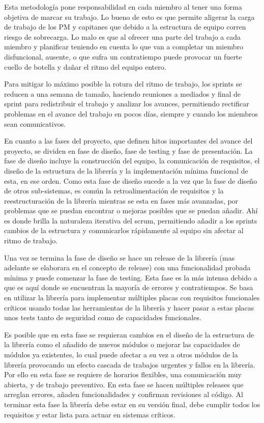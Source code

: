 \documentclass{report}
\begin{document}
Esta metodología pone responsabilidad en cada miembro al tener una forma objetiva de marcar su trabajo. Lo bueno de esto es que permite aligerar la carga de trabajo de los PM y capitanes que debido a la estructura de equipo corren riesgo de sobrecarga. Lo malo es que al ofrecer una parte del trabajo a cada miembro y planificar teniendo en cuenta lo que van a completar un miembro disfuncional, ausente, o que sufra un contratiempo puede provocar un fuerte cuello de botella y dañar el ritmo del equipo entero. \par
Para mitigar lo máximo posible la rotura del ritmo de trabajo, los sprints se reducen a una semana de tamaño, haciendo reuniones a mediados y final de sprint para redistribuir el trabajo y analizar los avances, permitiendo rectificar problemas en el avance del trabajo en pocos días, siempre y cuando los miembros sean comunicativos.
\par \vspace{0.3 cm}
En cuanto a las fases del proyecto, que definen hitos importantes del avance del proyecto, se dividen en fase de diseño, fase de testing y fase de presentación. La fase de diseño incluye la construcción del equipo, la comunicación de requisitos, el diseño de la estructura de la librería y la implementación mínima funcional de esta, en ese orden. Como esta fase de diseño sucede a la vez que la fase de diseño de otros sub-sistemas, es común la retroalimentación de requisitos y la reestructuración de la librería mientras se esta en fases más avanzadas, por problemas que se puedan encontrar o mejoras posibles que se puedan añadir. Ahí es donde brilla la naturaleza iterativa del scrum, permitiendo añadir a los sprints cambios de la estructura y comunicarlos rápidamente al equipo sin afectar al ritmo de trabajo. \par \vspace{0.3 cm}
Una vez se termina la fase de diseño se hace un release de la librería (mas adelante se elaborara en el concepto de release) con una funcionalidad probada mínima y puede comenzar la fase de testing. Esta fase es la más intensa debido a que es aquí donde se encuentran la mayoría de errores y contratiempos. Se basa en utilizar la librería para implementar múltiples placas con requisitos funcionales críticos usando todas las herramientas de la librería y hacer pasar a estas placas unos tests tanto de seguridad como de capacidades funcionales. \par
Es posible que en esta fase se requieran cambios en el diseño de la estructura de la librería como el añadido de nuevos módulos o mejorar las capacidades de módulos ya existentes, lo cual puede afectar a su vez a otros módulos de la librería provocando un efecto cascada de trabajos urgentes y fallos en la librería. Por ello en esta fase se requiere de horarios flexibles, una comunicación muy abierta, y de trabajo preventivo. En esta fase se hacen múltiples releases que arreglan errores, añaden funcionalidades y confirman revisiones al código. Al terminar esta fase la librería debe estar en su versión final, debe cumplir todos los requisitos y estar lista para actuar en sistemas críticos. \par \vspace{0.3 cm}
\end{document}
